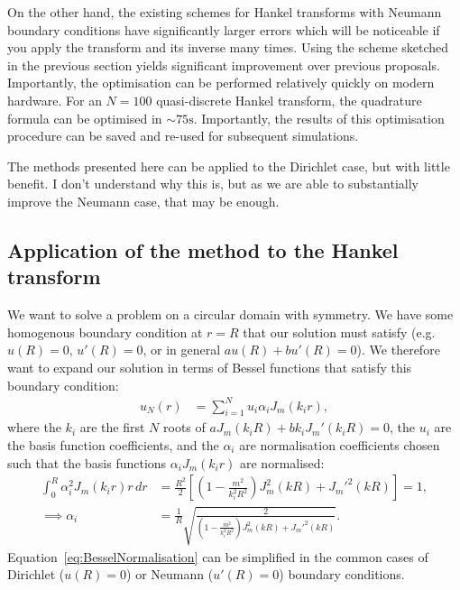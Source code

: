 \documentclass[aip,amsmath,amssymb,reprint,twocolumn]{revtex4-1}
\begin{document}
On the other hand, the existing schemes for Hankel transforms with Neumann boundary conditions have significantly larger errors which will be noticeable if you apply the transform and its inverse many times.  Using the scheme sketched in the previous section yields significant improvement over previous proposals.  Importantly, the optimisation can be performed relatively quickly on modern hardware.  For an $N=100$ quasi-discrete Hankel transform, the quadrature formula can be optimised in $\sim 75\text{s}$.  Importantly, the results of this optimisation procedure can be saved and re-used for subsequent simulations.

The methods presented here can be applied to the Dirichlet case, but with little benefit.  I don't understand why this is, but as we are able to substantially improve the Neumann case, that may be enough.


\begin{widetext}
\section{Application of the method to the Hankel transform}
\label{sec:HankelApplication}
We want to solve a problem on a circular domain with symmetry.  We have some homogenous boundary condition at $r=R$ that our solution must satisfy (e.g.\ $u(R) = 0$, $u'(R) = 0$, or in general $a u(R) + b u'(R) = 0$).  We therefore want to expand our solution in terms of Bessel functions that satisfy this boundary condition:
\begin{align}
  u_N(r) &= \sum_{i=1}^N u_i \alpha_i J_m(k_i r),
\end{align}
where the $k_i$ are the first $N$ roots of $a J_m(k_i R) + b k_i J_m'(k_i R) = 0$, the $u_i$ are the basis function coefficients, and the $\alpha_i$ are normalisation coefficients chosen such that the basis functions $\alpha_i J_m(k_i r)$ are normalised:
\begin{align}
  \int_0^R \alpha_i^2 J_m(k_i r) r\, dr &= \frac{R^2}{2}\left[\left(1 - \frac{m^2}{k_i^2 R^2}\right) J_m^2(k R) + {J_m'}^2(k R)\right] = 1,\\
  \implies \alpha_i &= \frac{1}{R} \sqrt{\frac{2}{\left(1 - \frac{m^2}{k_i^2 R^2}\right) J_m^2(k R) + {J_m'}^2(k R)}}. \label{eq:BesselNormalisation}
\end{align}
Equation~\eqref{eq:BesselNormalisation} can be simplified in the common cases of Dirichlet ($u(R) = 0$) or Neumann ($u'(R) = 0$) boundary conditions.
\end{widetext}
\end{document}
